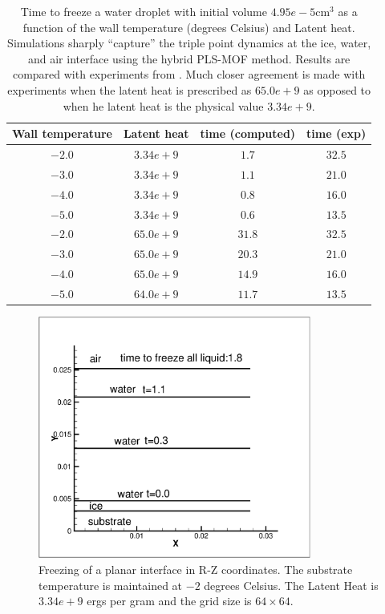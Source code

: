 \documentclass[]{article}
\begin{document}
\begin{table}[h!]
	\caption{Time to freeze a water droplet with 
	initial volume $4.95e-5\mbox{cm}^{3}$ as a 
	function of the wall temperature (degrees Celsius)
	and Latent heat.  Simulations sharply ``capture'' 
        the triple point dynamics at the ice, water, and air 
        interface using the hybrid PLS-MOF method.
        Results are
	compared with experiments from \cite{hu2010icing}.  
	Much closer agreement is made with experiments when
	the latent heat is prescribed as $65.0e+9$ as opposed
	to when he latent heat is the physical value
	$3.34e+9$.
}
\centering
\begin{tabular}{|c|c|c|c|}
\hline
Wall temperature & Latent heat & time (computed) & time (exp) 
	 \\ \hline
$-2.0$ & $3.34e+9$ & $1.7$ & $32.5$ \\ \hline
$-3.0$ & $3.34e+9$ & $1.1$ & $21.0$ \\ \hline
$-4.0$ & $3.34e+9$ & $0.8$ & $16.0$ \\ \hline
$-5.0$ & $3.34e+9$ & $0.6$ & $13.5$ \\ \hline
$-2.0$ & $65.0e+9$ & $31.8$ & $32.5$ \\ \hline
$-3.0$ & $65.0e+9$ & $20.3$ & $21.0$ \\ \hline
$-4.0$ & $65.0e+9$ & $14.9$ & $16.0$ \\ \hline
$-5.0$ & $64.0e+9$ & $11.7$ & $13.5$ \\ \hline
\end{tabular}
\label{freezing_time}
\end{table}


\begin{figure}[htbp]
\centering
\includegraphics[width=0.8\textwidth]{freeze1d.eps} 
\caption{Freezing of a planar interface in R-Z coordinates.  
 The substrate temperature
 is maintained at $-2$ degrees Celsius. 
 The Latent Heat is $3.34e+9$ ergs per gram and
 the grid size is $64\times 64$. }
\label{rect_freeze}
\end{figure}
\end{document}
